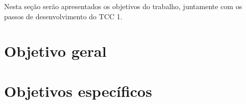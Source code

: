 Nesta seção serão apresentados os objetivos do trabalho, juntamente com os passos de desenvolvimento do TCC 1.

\section{Objetivo geral}



\section{Objetivos específicos}




 
